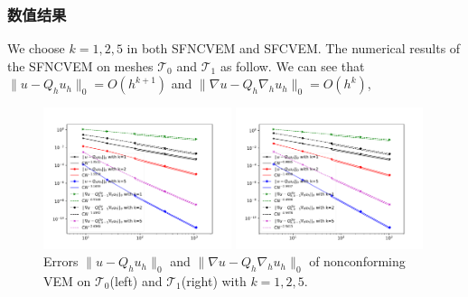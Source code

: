 \documentclass[notheorems,serif]{beamer}
\begin{document}
\begin{frame}
    \frametitle{数值结果}
We choose $k = 1, 2, 5$ in both SFNCVEM and SFCVEM.
The numerical results of the SFNCVEM on meshes $\mathcal T_0$ and $\mathcal T_1$
as follow. We can see that $\|u - Q_h u_h\|_0=O(h^{k+1})$ and $\|\nabla u -
Q_{h}\nabla_h u_h\|_0=O(h^{k})$, 
\begin{figure}[htbp]
\centering
\begin{minipage}[t]{0.49\linewidth}
\centering
\includegraphics[width=5.5cm]{../figures/stabfree/ncvem_convex.pdf}
\end{minipage}%
\begin{minipage}[t]{0.49\linewidth}
\centering
\includegraphics[width=5.5cm]{../figures/stabfree/ncvem_nonconvex.pdf}
\end{minipage}%
\centering
\caption{Errors $\|u - Q_h u_h\|_0$ and $\|\nabla u - Q_{h}\nabla_h u_h\|_0$
of nonconforming VEM on
$\mathcal T_0$(left) and $\mathcal T_1$(right) with $k=1, 2, 5$.}
\label{fig:rate1}
\end{figure}


\end{frame}
\end{document}
